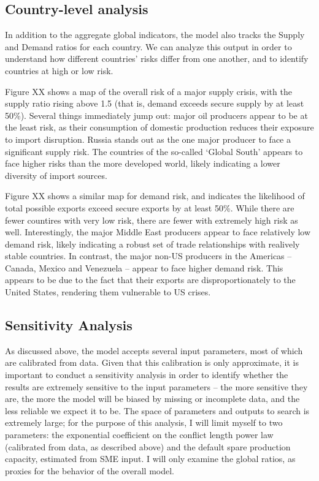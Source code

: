 \documentclass{article}
\begin{document}
\subsection{Country-level analysis}

In addition to the aggregate global indicators, the model also tracks the Supply and Demand ratios for each country. We can analyze this output in order to understand how different countries' risks differ from one another, and to identify countries at high or low risk.

Figure XX shows a map of the overall risk of a major supply crisis, with the supply ratio rising above 1.5 (that is, demand exceeds secure supply by at least 50\%). Several things immediately jump out: major oil producers appear to be at the least risk, as their consumption of domestic production reduces their exposure to import disruption. Russia stands out as the one major producer to face a significant supply risk. The countries of the so-called `Global South' appears to face higher risks than the more developed world, likely indicating a lower diversity of import sources.

Figure XX shows a similar map for demand risk, and indicates the likelihood of total possible exports exceed secure exports by at least 50\%. While there are fewer countires with very low risk, there are fewer with extremely high risk as well. Interestingly, the major Middle East producers appear to face relatively low demand risk, likely indicating a robust set of trade relationships with realively stable countries. In contrast, the major non-US producers in the Americas -- Canada, Mexico and Venezuela -- appear to face higher demand risk. This appears to be due to the fact that their exports are disproportionately to the United States, rendering them vulnerable to US crises.

\subsection{Sensitivity Analysis}

As discussed above, the model accepts several input parameters, most of which are calibrated from data. Given that this calibration is only approximate, it is important to conduct a sensitivity analysis in order to identify whether the results are extremely sensitive to the input parameters -- the more sensitive they are, the more the model will be biased by missing or incomplete data, and the less reliable we expect it to be. The space of parameters and outputs to search is extremely large; for the purpose of this analysis, I will limit myself to two parameters: the exponential coefficient on the conflict length power law (calibrated from data, as described above) and the default spare production capacity, estimated from SME input. I will only examine the global ratios, as proxies for the behavior of the overall model.
\end{document}
